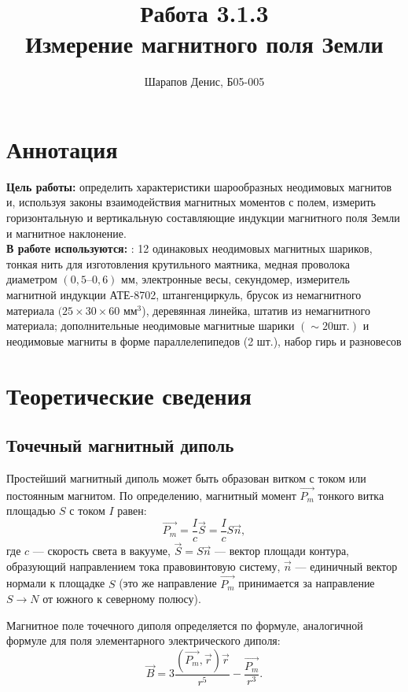 \documentclass[a4paper]{article}
\title{Работа 3.1.3 \\ Измерение магнитного поля Земли}
\author{Шарапов Денис, Б05-005}
\date{}
\theoremstyle{definition}
\theoremstyle{remark}
\begin{document}
    \maketitle
    \tableofcontents
    \newpage
    
\section{Аннотация}

 \textbf{Цель работы:} определить характеристики шарообразных неодимовых магнитов и, используя законы взаимодействия магнитных моментов с полем, измерить горизонтальную и вертикальную составляющие индукции магнитного поля Земли и магнитное наклонение. \\
 
 \noindent \textbf{В работе используются:} : 12 одинаковых неодимовых магнитных шариков, тонкая нить для изготовления крутильного маятника, медная проволока диаметром $(0,5 – 0,6)$ мм, электронные весы, секундомер, измеритель магнитной индукции АТЕ-8702, штангенциркуль, брусок из немагнитного материала $(25 \times 30 \times 60$ $\text{мм}^3$), деревянная линейка, штатив из немагнитного материала; дополнительные неодимовые магнитные шарики $(\sim 20 \text{шт}.)$ и неодимовые магниты в форме параллелепипедов (2 шт.), набор гирь и разновесов
 
 \section{Теоретические сведения}
 
 \subsection{Точечный магнитный диполь}
 
 Простейший магнитный диполь может быть образован витком с током или постоянным магнитом. По определению, магнитный момент $\vec{P_m}$ тонкого витка площадью $S$ с током $I$ равен: $$\vec{P_m} = \frac{I}{c}\vec{S} = \frac{I}{c}S \vec{n},$$
 где $c$ --- скорость света в вакууме, $\vec{S} = S\vec{n}$ --- вектор площади контура, образующий  направлением тока правовинтовую систему, $\vec{n}$ --- единичный вектор нормали к площадке $S$ (это же направление $\vec{P_m}$ принимается за направление $S \rightarrow N$ от южного к северному полюсу).
 
 Магнитное поле точечного диполя определяется по формуле, аналогичной формуле для поля элементарного электрического диполя: $$\vec{B} = 3\frac{(\vec{P_m}, \vec{r})\vec{r}}{r^5} - \frac{\vec{P_m}}{r^3}.$$
 
\end{document}
